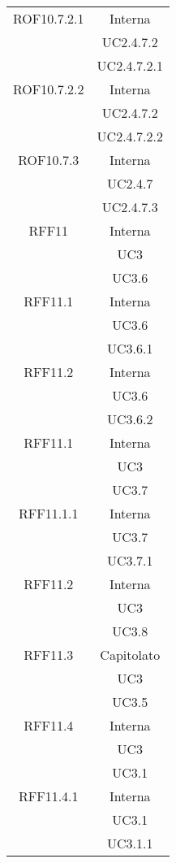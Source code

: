 \begin{longtable}{|c|c|}
\midrule
ROF10.7.2.1
& Interna\\
& UC2.4.7.2\\
& UC2.4.7.2.1
\\

\midrule
ROF10.7.2.2
& Interna\\
& UC2.4.7.2\\
& UC2.4.7.2.2
\\

\midrule
ROF10.7.3
& Interna\\
& UC2.4.7\\
& UC2.4.7.3
\\



\midrule
RFF11
& Interna\\
& UC3\\
& UC3.6\\

\midrule
RFF11.1
& Interna\\
& UC3.6\\
& UC3.6.1\\

\midrule
RFF11.2
& Interna\\
& UC3.6\\
& UC3.6.2\\

\midrule
RFF11.1
& Interna\\
& UC3\\
& UC3.7\\

\midrule
RFF11.1.1
& Interna\\
& UC3.7\\
& UC3.7.1\\

\midrule
RFF11.2
& Interna\\
& UC3\\
& UC3.8\\

\midrule
RFF11.3
& Capitolato\\
& UC3\\
& UC3.5\\

\midrule
RFF11.4
& Interna\\
& UC3\\
& UC3.1\\

\midrule
RFF11.4.1
& Interna\\
& UC3.1\\
& UC3.1.1\\


\end{longtable}
